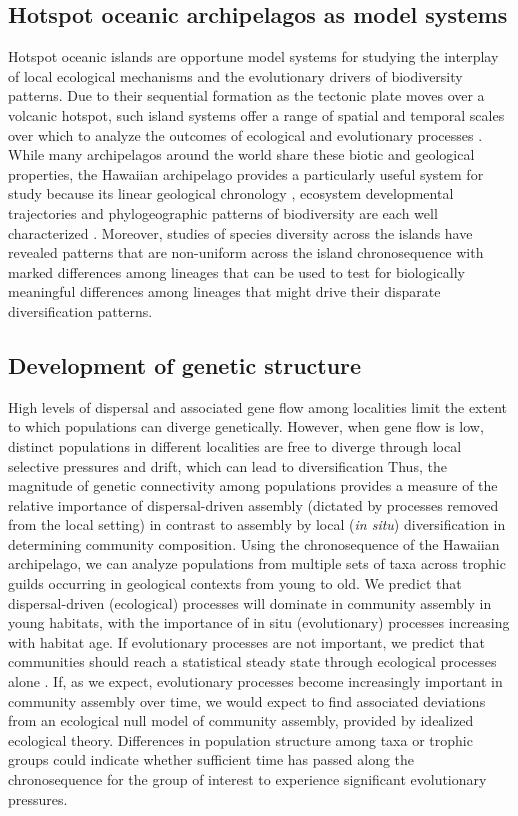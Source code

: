 \subsection{Hotspot oceanic archipelagos as model systems}

Hotspot oceanic islands are opportune model systems for studying the
interplay of local ecological mechanisms and the evolutionary drivers
of biodiversity patterns. Due to their sequential formation as the
tectonic plate moves over a volcanic hotspot, such island systems
offer a range of spatial and temporal scales over which to analyze the
outcomes of ecological and evolutionary processes
\citep{warren2015}. While many archipelagos around the world share
these biotic and geological properties, the Hawaiian archipelago
provides a particularly useful system for study because its linear
geological chronology \citep{price2002}, ecosystem developmental
trajectories \citep{vitousek2004} and phylogeographic patterns of
biodiversity are each well characterized \citep{wagner1995}. Moreover,
studies of species diversity across the islands have revealed patterns
that are non-uniform across the island chronosequence with marked
differences among lineages \citep[e.g.][]{gruner2007, gillespie2009}
that can be used to test for biologically meaningful differences among
lineages that might drive their disparate diversification patterns.


\subsection{Development of genetic structure}

High levels of dispersal and associated gene flow among localities
limit the extent to which populations can diverge
genetically. However, when gene flow is low, distinct populations in
different localities are free to diverge through local selective
pressures and drift, which can lead to diversification
\citep{slatkin1987} Thus, the magnitude of genetic connectivity among
populations provides a measure of the relative importance of
dispersal-driven assembly (dictated by processes removed from the
local setting) in contrast to assembly by local (\textit{in situ})
diversification in determining community composition. Using the
chronosequence of the Hawaiian archipelago, we can analyze populations
from multiple sets of taxa across trophic guilds occurring in
geological contexts from young to old. We predict that
dispersal-driven (ecological) processes will dominate in community
assembly in young habitats, with the importance of in situ
(evolutionary) processes increasing with habitat age. If evolutionary
processes are not important, we predict that communities should reach
a statistical steady state through ecological processes alone
\citep{harte2011}. If, as we expect, evolutionary processes become
increasingly important in community assembly over time, we would
expect to find associated deviations from an ecological null model of
community assembly, provided by idealized ecological
theory. Differences in population structure among taxa or trophic
groups could indicate whether sufficient time has passed along the
chronosequence for the group of interest to experience significant
evolutionary pressures.


